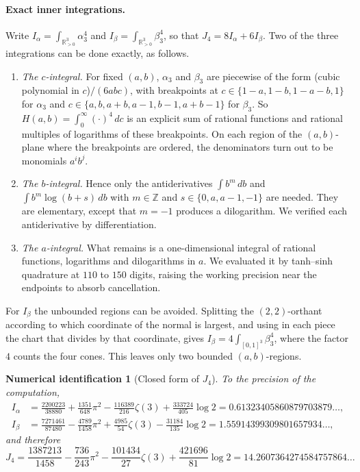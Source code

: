\documentclass[11pt]{article}
\newtheorem{identification}[theorem]{Numerical identification}
\theoremstyle{definition}
\newcommand{\Z}{\mathbb{Z}}
\newcommand{\R}{\mathbb{R}}
\begin{document}
\paragraph{Exact inner integrations.} Write $I_\alpha=\int_{\R^3_{>0}}\alpha_3^4$ and $I_\beta=\int_{\R^3_{>0}}\beta_3^4$, so that $J_4=8I_\alpha+6I_\beta$. Two of the three integrations can be done exactly, as follows.
\begin{enumerate}[label=(\roman*),leftmargin=*]
\item \emph{The $c$-integral.} For fixed $(a,b)$, $\alpha_3$ and $\beta_3$ are piecewise of the form (cubic polynomial in $c$)$/(6abc)$, with breakpoints at $c\in\{1-a,1-b,1-a-b,1\}$ for $\alpha_3$ and $c\in\{a,b,a+b,a-1,b-1,a+b-1\}$ for $\beta_3$. So $H(a,b)=\int_0^\infty(\cdot)^4\,dc$ is an explicit sum of rational functions and rational multiples of logarithms of these breakpoints. On each region of the $(a,b)$-plane where the breakpoints are ordered, the denominators turn out to be monomials $a^ib^j$.
\item \emph{The $b$-integral.} Hence only the antiderivatives $\int b^m\,db$ and $\int b^m\log(b+s)\,db$ with $m\in\Z$ and $s\in\{0,a,a-1,-1\}$ are needed. They are elementary, except that $m=-1$ produces a dilogarithm. We verified each antiderivative by differentiation.
\item \emph{The $a$-integral.} What remains is a one-dimensional integral of rational functions, logarithms and dilogarithms in $a$. We evaluated it by tanh--sinh quadrature at $110$ to $150$ digits, raising the working precision near the endpoints to absorb cancellation.
\end{enumerate}
For $I_\beta$ the unbounded regions can be avoided. Splitting the $(2,2)$-orthant according to which coordinate of the normal is largest, and using in each piece the chart that divides by that coordinate, gives $I_\beta=4\int_{[0,1]^3}\beta_3^4$, where the factor $4$ counts the four cones. This leaves only two bounded $(a,b)$-regions.

\begin{identification}[Closed form of $J_4$]\label{prop:J4}
To the precision of the computation,
\begin{align*}
I_\alpha&=\frac{2200223}{38880}+\frac{1351}{648}\pi^2-\frac{116389}{216}\zeta(3)+\frac{333724}{405}\log2=0.61323405860879703879\ldots,\\
I_\beta&=\frac{7271461}{87480}-\frac{4789}{1458}\pi^2+\frac{4985}{54}\zeta(3)-\frac{31184}{135}\log2=1.55914399309801657934\ldots,
\end{align*}
and therefore
\[
J_4=\frac{1387213}{1458}-\frac{736}{243}\pi^2-\frac{101434}{27}\zeta(3)+\frac{421696}{81}\log2=14.2607364274584757864\ldots
\]
\end{identification}
\end{document}
